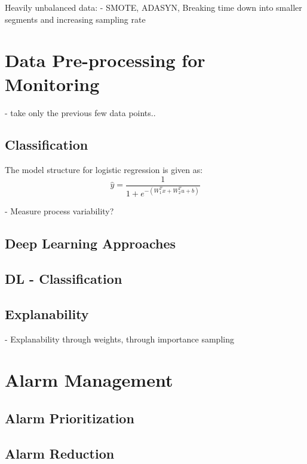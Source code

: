 Heavily unbalanced data:
- SMOTE, ADASYN, Breaking time down into smaller segments and increasing sampling rate

\section{Data Pre-processing for Monitoring}
- take only the previous few data points..

\subsection{Classification}
The model structure for logistic regression is given as:
\begin{equation}
    \hat{y} = \frac{1}{1 + e^{-(W_1^Tx + W_2^Tu + b)}}
    \label{eq:02LogS}
\end{equation}

- Measure process variability?

\subsection{Deep Learning Approaches}
\subsection{DL - Classification}

\subsection{Explanability}
- Explanability through weights, through importance sampling

\section{Alarm Management}

\subsection{Alarm Prioritization}

\subsection{Alarm Reduction}
